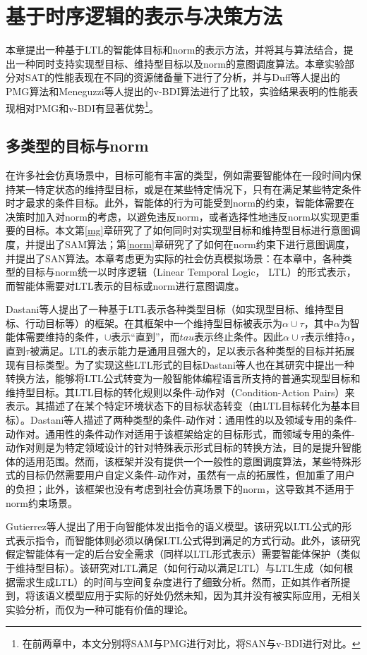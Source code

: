 \chapter{基于时序逻辑的表示与决策方法}
本章提出一种基于LTL的智能体目标和norm的表示方法，并将其与\SA 算法结合，提出一种同时支持实现型目标、维持型目标以及norm的意图调度算法\SAT。本章实验部分对SAT的性能表现在不同的资源储备量下进行了分析，并与Duff等人提出的PMG\cite{DBLP:conf/atal/DuffHT06}算法和Meneguzzi等人提出的v-BDI算法进行了比较，实验结果表明\SAT 的性能表现相对PMG和v-BDI有显著优势\footnote{在前两章中，本文分别将SAM与PMG进行对比，将SAN与v-BDI进行对比。}。
\section{多类型的目标与norm}
在许多社会仿真场景中，目标可能有丰富的类型，例如需要智能体在一段时间内保持某一特定状态的维持型目标，或是在某些特定情况下，只有在满足某些特定条件时才最求的条件目标。此外，智能体的行为可能受到norm的约束，智能体需要在决策时加入对norm的考虑，以避免违反norm，或者选择性地违反norm以实现更重要的目标。本文第\ref{mg}章研究了了如何同时对实现型目标和维持型目标进行意图调度，并提出了SAM算法；第\ref{norm}章研究了了如何在norm约束下进行意图调度，并提出了SAN算法。本章考虑更为实际的社会仿真模拟场景：在本章中，各种类型的目标与norm统一以时序逻辑（Linear Temporal Logic， LTL）的形式表示，而智能体需要对LTL表示的目标或norm进行意图调度。

Dastani等人\cite{}提出了一种基于LTL表示各种类型目标（如实现型目标、维持型目标、行动目标等）的框架。在其框架中一个维持型目标被表示为$\alpha \cup \tau$，其中$\alpha$为智能体需要维持的条件，$\cup$表示“直到”，而$tau$表示终止条件。因此$\alpha \cup \tau$表示维持$\alpha$，直到$\tau$被满足。LTL的表示能力是通用且强大的，足以表示各种类型的目标并拓展现有目标类型。为了实现这些LTL形式的目标Dastani等人\cite{}也在其研究中提出一种转换方法，能够将LTL公式转变为一般智能体编程语言所支持的普通实现型目标和维持型目标。其LTL目标的转化规则以条件-动作对（Condition-Action Pairs）来表示。其描述了在某个特定环境状态下的目标状态转变（由LTL目标转化为基本目标）。Dastani等人\cite{}描述了两种类型的条件-动作对：通用性的以及领域专用的条件-动作对。通用性的条件动作对适用于该框架给定的目标形式，而领域专用的条件-动作对则是为特定领域设计的针对特殊表示形式目标的转换方法，目的是提升智能体的适用范围。然而，该框架并没有提供一个一般性的意图调度算法，某些特殊形式的目标仍然需要用户自定义条件-动作对，虽然有一点的拓展性，但加重了用户的负担；此外，该框架也没有考虑到社会仿真场景下的norm，这导致其不适用于norm约束场景。

Gutierrez等人提出了用于向智能体发出指令的语义模型。该研究以LTL公式的形式表示指令，而智能体则必须以确保LTL公式得到满足的方式行动。此外，该研究假定智能体有一定的后台安全需求（同样以LTL形式表示）需要智能体保护（类似于维持型目标）。该研究对LTL满足（如何行动以满足LTL）与LTL生成（如何根据需求生成LTL）的时间与空间复杂度进行了细致分析。然而，正如其作者所提到，将该语义模型应用于实际的好处仍然未知，因为其并没有被实际应用，无相关实验分析，而仅为一种可能有价值的理论。

